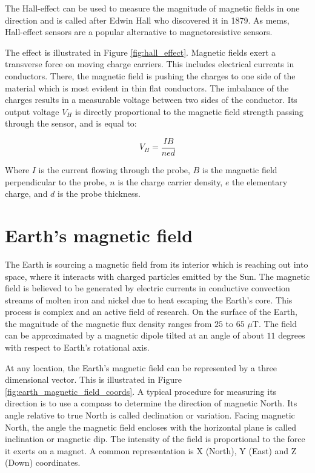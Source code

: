 The Hall-effect can be used to measure the magnitude of magnetic fields in one direction and is called after Edwin Hall who discovered it in 1879. As \gls{mems}, Hall-effect sensors are a popular alternative to magnetoresistive sensors.

The effect is illustrated in Figure \ref{fig:hall_effect}. Magnetic fields exert a transverse force on moving charge carriers. This includes electrical currents in conductors. There, the magnetic field is pushing the charges to one side of the material which is most evident in thin flat conductors. The imbalance of the charges results in a measurable voltage between two sides of the conductor. Its output voltage $V_H$ is directly proportional to the magnetic field strength passing through the sensor, and is equal to:

\begin{equation}
\label{eq:hall_effect}
    V_H = \frac{I B}{n e d}
\end{equation}

Where $I$ is the current flowing through the probe, $B$ is the magnetic field perpendicular to the probe, $n$ is the charge carrier density, $e$ the elementary charge, and $d$ is the probe thickness.

\section{Earth's magnetic field}

The Earth is sourcing a magnetic field from its interior which is reaching out into space, where it interacts with charged particles emitted by the Sun. The magnetic field is believed to be generated by electric currents in conductive convection streams of molten iron and nickel due to heat escaping the Earth's core. This process is complex and an active field of research. On the surface of the Earth, the magnitude of the magnetic flux density ranges from $25$ to $65$ $\mu$T. The field can be approximated by a magnetic dipole tilted at an angle of about $11$ degrees with respect to Earth's rotational axis.\cite{earth_magnetic_bible}\cite{earth_magnetic}

At any location, the Earth's magnetic field can be represented by a three dimensional vector. This is illustrated in Figure \ref{fig:earth_magnetic_field_coords}. A typical procedure for measuring its direction is to use a compass to determine the direction of magnetic North. Its angle relative to true North is called declination or variation. Facing magnetic North, the angle the magnetic field encloses with the horizontal plane is called inclination or magnetic dip. The intensity of the field is proportional to the force it exerts on a magnet. A common representation is X (North), Y (East) and Z (Down) coordinates.\cite{earth_magnetic}\cite{WWM2015}

